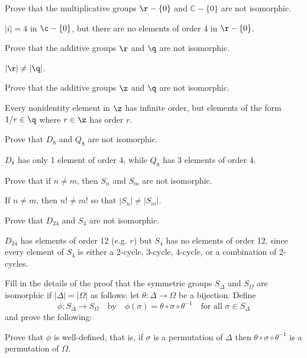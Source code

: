 \begin{problems}
\begin{sol}
    \end{sol}
    \item Prove that the multiplicative groups $\r - \{0\}$ and $\mathbb{C} - \{0\}$ are not isomorphic.
    \begin{sol}
        $|i| = 4$ in $\c - \{0\}$, but there are no elements of order 4 in $\r - \{0\}$.
    \end{sol}
    \item Prove that the additive groups $\r$ and $\q$ are not isomorphic.
    \begin{sol}
        $|\r| \neq |\q|$.
    \end{sol}
    \item Prove that the additive groups $\z$ and $\q$ are not isomorphic.
    \begin{sol}
        Every nonidentity element in $\z$ has infinite order, but elements of the form $1/r \in \q$ where $r \in \z$ has order $r$.
    \end{sol}
    \item Prove that $D_8$ and $Q_8$ are not isomorphic.
    \begin{sol}
        $D_8$ has only 1 element of order 4, while $Q_8$ has 3 elements of order 4.
    \end{sol}
    \item Prove that if $n \neq m$, then $S_n$ and $S_m$ are not isomorphic.
    \begin{sol}
        If $n \neq m$, then $n! \neq m!$ so that $|S_n| \neq |S_m|$.
    \end{sol}
    \item Prove that $D_{24}$ and $S_4$ are not isomorphic.
    \begin{sol}
        $D_{24}$ has elements of order 12 (e.g. $r$) but $S_4$ has no elements of order 12, since every element of $S_4$ is either a 2-cycle, 3-cycle, 4-cycle, or a combination of 2-cycles.
    \end{sol}
    \item Fill in the details of the proof that the symmetric groups $S_\Delta$ and $S_\Omega$ are isomorphic if $|\Delta| = |\Omega|$ as follows: let $\theta : \Delta \to \Omega$ be a bijection. Define
    \[
    \phi : S_\Delta \to S_\Omega \quad \text{by} \quad \phi(\sigma) = \theta \circ \sigma \circ \theta^{-1} \quad \text{for all } \sigma \in S_\Delta
    \]
    and prove the following:
    \begin{problems}
        \item Prove that $\phi$ is well-defined, that is, if $\sigma$ is a permutation of $\Delta$ then $\theta \circ \sigma \circ \theta^{-1}$ is a permutation of $\Omega$.

\end{problems}
\end{problems}
